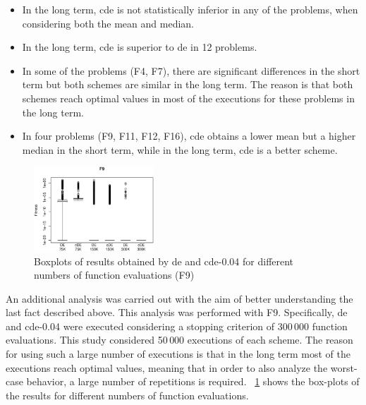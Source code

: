 \documentclass[preprint,3p]{elsarticle}
\newcommand{\CDE}{c{\sc de}}
\newcommand{\DE}{{\sc de}}
\begin{document}
\begin{itemize}
	\item In the long term, \CDE{} is not statistically inferior in any of the problems, when considering both the mean and median.
	\item In the long term, \CDE{} is superior to \DE{} in 12 problems.
	\item In some of the problems (F4, F7), there are significant differences
       in the short term but both schemes are similar in the long term. The reason is that
       both schemes reach optimal values in most of the executions for these problems in the long term.
	\item In four problems (F9, F11, F12, F16), \CDE{} obtains a lower mean but a higher median
     in the short term, while in the long term, \CDE{} is a better scheme.
\end{itemize}

\begin{figure}[t]
\centering
	\includegraphics[width=0.40\textwidth]{images/cde004_vs_de_boxplots/F9.eps}
\caption{Boxplots of results obtained by \DE{} and \CDE{}-0.04 for different numbers of function evaluations (F9)}
\label{fig:boxplot_cde004_vs_de_f9}
\end{figure}



An additional analysis was carried out with the aim of better understanding the last fact described above.
%
This analysis was performed with F9.
%
Specifically, \DE{} and \CDE{}-0.04 were executed considering a stopping criterion of 300$\,$000 function evaluations.
%
This study considered 50$\,$000 executions of each scheme.
%
The reason for using such a large number of executions is that in the long term most of
the executions reach optimal values, meaning that in order to also analyze the worst-case behavior,
a large number of repetitions is required.
%
\figurename~\ref{fig:boxplot_cde004_vs_de_f9} shows the box-plots of the results for different numbers of function evaluations.
\end{document}
